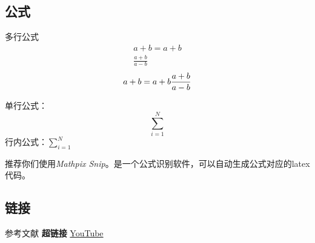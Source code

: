 \documentclass[a4paper]{article}
\begin{document}
\subsection{公式}

多行公式
\begin{align}
  a+b = a + b \\
  \frac{a+b}{a-b}
\end{align}
\begin{equation}
    a+b = a + b \\
  \frac{a+b}{a-b}
\end{equation}

单行公式：$$\sum^N_{i=1}$$
行内公式：$\sum^N_{i=1}$

推荐你们使用\textit{Mathpix Snip}。是一个公式识别软件，可以自动生成公式对应的latex代码。

\subsection{链接}
参考文献\cite{quinn1994parallel}\cite{golub2014scientific}\cite{joseph2022parallel}
\textbf{超链接}  \href{http://youtube.com/}{YouTube}

\newpage

 
\end{document}
